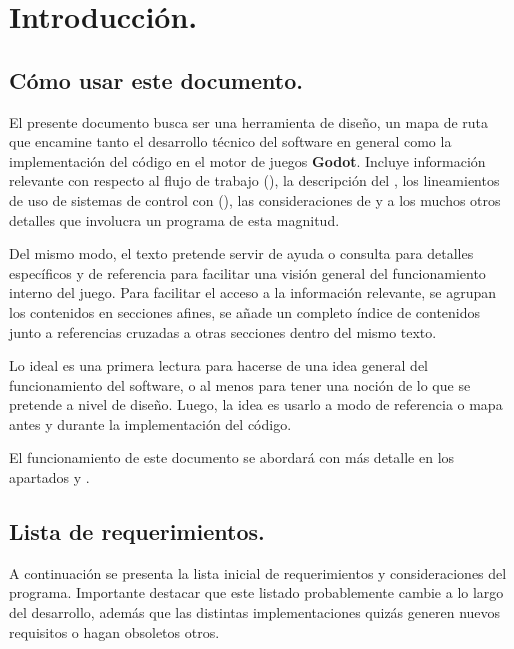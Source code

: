 
\section{Introducción.}\label{intro:introduccion}

\subsection{Cómo usar este documento.}\label{intro:como-usar-documento}
El presente documento busca ser una herramienta de diseño, un mapa de ruta que encamine tanto el desarrollo técnico del software en general como la implementación del código en el motor de juegos \textbf{Godot}. Incluye información relevante con respecto al flujo de trabajo (), la descripción del , los lineamientos de uso de sistemas de control con  (), las consideraciones de  y a los muchos otros detalles que involucra un programa de esta magnitud.

Del mismo modo, el texto pretende servir de ayuda o consulta para detalles específicos y de referencia para facilitar una visión general del funcionamiento interno del juego. Para facilitar el acceso a la información relevante, se agrupan los contenidos en secciones afines, se añade un completo índice de contenidos junto a referencias cruzadas a otras secciones dentro del mismo texto.

Lo ideal es una primera lectura para hacerse de una idea general del funcionamiento del software, o al menos para tener una noción de lo que se pretende a nivel de diseño. Luego, la idea es usarlo a modo de referencia o mapa antes y durante la implementación del código.

El funcionamiento de este documento se abordará con más detalle en los apartados  y  .

\subsection{Lista de requerimientos.}\label{intro:lista-de-requerimientos}
A continuación se presenta la lista inicial de requerimientos y consideraciones del programa. Importante destacar que este listado probablemente cambie a lo largo del desarrollo, además que las distintas implementaciones quizás generen nuevos requisitos o hagan obsoletos otros.

